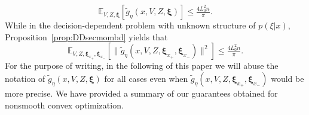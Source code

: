 \documentclass[11pt,reqno]{amsart}
\newcommand{\1}{{\bf 1}}
\newcommand{\2}{{\bf 2}}
\newcommand{\mr}[1]{{\color{blue}#1}}
\newcommand{\us}[1]{\textcolor{red}{#1}}
\newcommand{\bxi}{\boldsymbol{\xi}}
\newcommand{\lc}{\left[}
\newcommand{\rc}{\right]}
\numberwithin{equation}{section}
\theoremstyle{remark}
\begin{document}
{			\begin{equation*}
				\mathbb{E}_{V, Z, \bxi} \lc \tilde{g}_{\eta}(x, V, Z, \bxi) \rc \leq \tfrac{4L_0^2 n}{\pi}.
			\end{equation*}
			While in the decision-dependent problem with unknown structure of $p(\xi | x)$, Proposition~\ref{prop:DDsecmombd} yields that
			\begin{equation*}
				\mathbb{E}_{V, Z, \bxi_{x_{+}},\bxi_{x_{-}}} \lc \|\tilde{g}_{\eta}(x,V,Z,\bxi_{x_{+}},\bxi_{x_{-}})\|^2 \rc \leq \tfrac{4L_0^2n}{\pi}.
			\end{equation*}
			For the purpose of writing, in the following of this paper we will abuse the notation of $\tilde{g}_{\eta}(x, V, Z, \bxi)$ for all cases even when $\tilde{g}_\eta(x,V,Z,\bxi_{x_{+}},\bxi_{x_{-}})$ would be more precise. We have provided a summary of our guarantees obtained for nonsmooth convex optimization. %
			
}
\end{document}
